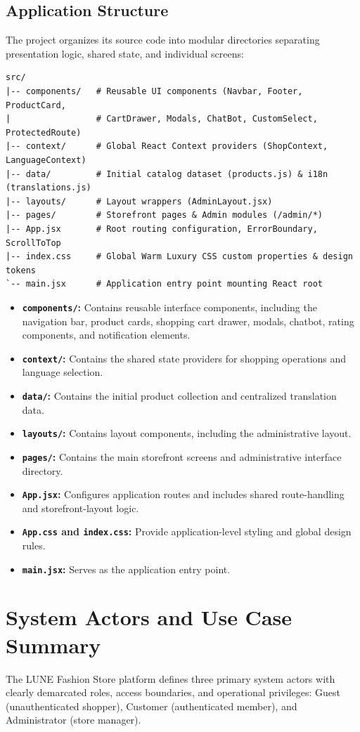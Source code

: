 \documentclass[12pt,a4paper,oneside]{report}
\begin{document}
\subsection{Application Structure}
The project organizes its source code into modular directories separating presentation logic, shared state, and individual screens:
\begin{verbatim}
src/
|-- components/   # Reusable UI components (Navbar, Footer, ProductCard,
|                 # CartDrawer, Modals, ChatBot, CustomSelect, ProtectedRoute)
|-- context/      # Global React Context providers (ShopContext, LanguageContext)
|-- data/         # Initial catalog dataset (products.js) & i18n (translations.js)
|-- layouts/      # Layout wrappers (AdminLayout.jsx)
|-- pages/        # Storefront pages & Admin modules (/admin/*)
|-- App.jsx       # Root routing configuration, ErrorBoundary, ScrollToTop
|-- index.css     # Global Warm Luxury CSS custom properties & design tokens
`-- main.jsx      # Application entry point mounting React root
\end{verbatim}
\begin{itemize}[leftmargin=1.2cm]
    \item \textbf{\texttt{components/}:} Contains reusable interface components, including the navigation bar, product cards, shopping cart drawer, modals, chatbot, rating components, and notification elements.
    \item \textbf{\texttt{context/}:} Contains the shared state providers for shopping operations and language selection.
    \item \textbf{\texttt{data/}:} Contains the initial product collection and centralized translation data.
    \item \textbf{\texttt{layouts/}:} Contains layout components, including the administrative layout.
    \item \textbf{\texttt{pages/}:} Contains the main storefront screens and administrative interface directory.
    \item \textbf{\texttt{App.jsx}:} Configures application routes and includes shared route-handling and storefront-layout logic.
    \item \textbf{\texttt{App.css} and \texttt{index.css}:} Provide application-level styling and global design rules.
    \item \textbf{\texttt{main.jsx}:} Serves as the application entry point.
\end{itemize}

\section{System Actors and Use Case Summary}
The LUNE Fashion Store platform defines three primary system actors with clearly demarcated roles, access boundaries, and operational privileges: Guest (unauthenticated shopper), Customer (authenticated member), and Administrator (store manager).
\end{document}
